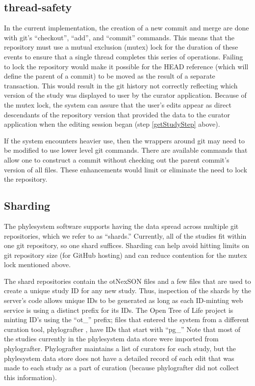 \documentclass{bioinfo}
\newcommand{\ps}{phylesystem\xspace}
\newcommand{\otol}{Open Tree of Life\xspace}
\newcommand{\nexson}{otNexSON\xspace}
\begin{document}
\begin{methods}
\subsection*{thread-safety}
In the current implementation, the creation of a new commit and merge are done with git's ``checkout'', ``add'', and ``commit'' commands.
This means that the repository must use a mutual exclusion (mutex) lock for the duration of these events
    to ensure that a single thread completes this series of operations.
Failing to lock the repository would make it possible for the HEAD reference (which
    will define the parent of a commit) to be moved as the result of a separate transaction.
This would result in the git history not correctly reflecting which version of the 
    study was displayed to user by the curator application.
Because of the mutex lock, the system can assure that the user's edits appear
    as direct descendants of the repository version that provided the data to 
    the curator application when the editing session began (step \ref{getStudyStep} above).

If the system encounters heavier use, then the wrappers around git may need to 
    be modified to use lower level git commands.
There are available commands that allow one to construct a commit without checking out
    the parent commit's version of all files.
These enhancements would limit or eliminate the need to lock the repository.
\subsection*{Sharding}
The \ps software supports having the data spread across multiple git repositories, which
    we refer to as ``shards.''
Currently, all of the studies fit within one git repository, so one shard suffices.
Sharding can help avoid hitting limits on git repository size (for GitHub hosting) and can 
    reduce contention for the mutex lock mentioned above.

The shard repositories contain the \nexson files and a few files that are used to 
    create a unique study ID for any new study.
Thus, inspection of the shards by the server's code allows unique IDs to be generated as long as 
    each ID-minting web service is using a distinct prefix for its IDs.
The \otol project is minting ID's using the ``ot\_'' prefix;
    files that entered the system from a different curation tool, phylografter \citep{Phylografter},
    have IDs that start with ``pg\_''
Note that most of the studies currently in the \ps data store were imported from phylografter.
Phylografter maintains a list of curators for each study, but the \ps data store does not
    have a detailed record of each edit that was made to each study as a part of 
    curation (because phylografter did not collect this information).


\end{methods}
\end{document}
